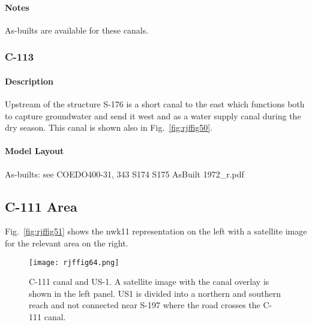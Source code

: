\begin{notes}
\paragraph{Notes}
As-builts are available for these canals.
\end{notes}


\clearpage
\subsubsection{C-113}
\paragraph{Description}
Upstream of the structure S-176 is a short canal to the east which functions both to capture groundwater and send it west and as a water supply canal during the dry season. This canal is shown also in Fig.~\ref{fig:rjffig50}.

\paragraph{Model Layout}


\begin{notes}
As-builts: see COEDO400-31, 343 S174 S175 AsBuilt 1972\_r.pdf
\end{notes}

\clearpage






\subsection{C-111 Area}
Fig.~\ref{fig:rjffig51} shows the nwk11 representation on the left with a satellite image for the relevant area on the right.

\begin{figure}[!h]
  \begin{center}
  \texttt{[image: rjffig64.png]}
  \caption[C-111 canal and US-1.]{C-111 canal and US-1. A satellite image with the canal overlay is shown in the left panel. US1 is divided into a northern and southern reach and not connected near S-197 where the road crosses the C-111 canal.}
  \label{fig:rjffig64}
  \end{center}
\end{figure}

